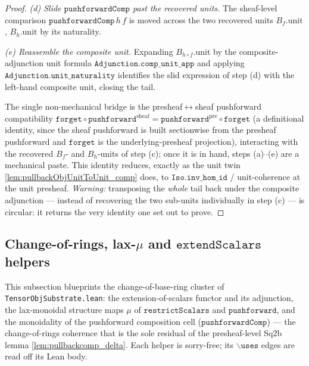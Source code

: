 \begin{proof}
  \emph{(d) Slide \(\mathtt{pushforwardComp}\) past the recovered units.} The sheaf-level
  comparison \(\mathtt{pushforwardComp}\,h\,f\) is moved across the two recovered units
  \(B_f.\mathrm{unit}\), \(B_h.\mathrm{unit}\) by its naturality.

  \emph{(e) Reassemble the composite unit.} Expanding
  \(B_{h \circ f}.\mathrm{unit}\) by the composite-adjunction unit formula
  \(\mathtt{Adjunction.comp\_unit\_app}\) and applying \(\mathtt{Adjunction.unit\_naturality}\)
  identifies the slid expression of step (d) with the left-hand composite unit, closing the
  tail.

  The single non-mechanical bridge is the presheaf\(\leftrightarrow\)sheaf pushforward
  compatibility \(\mathtt{forget} \circ \mathtt{pushforward}^{\mathrm{sheaf}} =
  \mathtt{pushforward}^{\mathrm{pre}} \circ \mathtt{forget}\) (a definitional identity, since
  the sheaf pushforward is built sectionwise from the presheaf pushforward and
  \(\mathtt{forget}\) is the underlying-presheaf projection), interacting with the recovered
  \(B_f\)- and \(B_h\)-units of step (c); once it is in hand, steps (a)--(e) are a mechanical
  paste. This identity reduces, exactly as the unit twin
  \cref{lem:pullbackObjUnitToUnit_comp} does, to \(\mathtt{Iso.inv\_hom\_id}\) /
  unit-coherence at the unit presheaf. \emph{Warning:} transposing the \emph{whole} tail back
  under the composite adjunction --- instead of recovering the two sub-units individually in
  step (c) --- is circular: it returns the very identity one set out to prove.
\end{proof}

\subsection{Change-of-rings, lax-\(\mu\) and \(\mathtt{extendScalars}\) helpers}
\label{subsec:tensorobj_changeofrings_helpers}

This subsection blueprints the change-of-base-ring cluster of
\texttt{TensorObjSubstrate.lean}: the extension-of-scalars functor and its adjunction,
the lax-monoidal structure maps \(\mu\) of \(\mathtt{restrictScalars}\) and
\(\mathtt{pushforward}\), and the monoidality of the pushforward composition cell
(\(\mathtt{pushforwardComp}\)) --- the change-of-rings coherence that is the sole residual
of the presheaf-level Sq2b lemma \cref{lem:pullbackcomp_delta}. Each helper is sorry-free;
its \(\mathtt{\backslash uses}\) edges are read off its Lean body.

